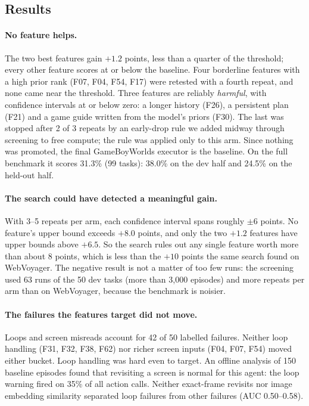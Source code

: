 \subsection{Results}

\paragraph{No feature helps.} The two best features gain $+1.2$ points, less than a quarter of the threshold; every
other feature scores at or below the baseline. Four borderline features with a high prior rank (F07, F04, F54, F17) were
retested with a fourth repeat, and none came near the threshold. Three features are
reliably \emph{harmful}, with confidence intervals at or below zero: a longer history (F26), a persistent plan (F21)
and a game guide written from the model's priors (F30). The last was stopped after 2 of 3 repeats by an early-drop
rule we added midway through screening to free compute; the rule was applied only to this arm. Since nothing was
promoted, the final GameBoyWorlds executor is the baseline. On the full benchmark it scores 31.3\% (99 tasks):
38.0\% on the dev half and 24.5\% on the held-out half.

\paragraph{The search could have detected a meaningful gain.} With 3--5 repeats per arm, each confidence interval
spans roughly $\pm 6$ points. No feature's upper bound exceeds $+8.0$ points, and only the two $+1.2$ features have
upper bounds above $+6.5$. So the search rules out any single feature worth more than about 8 points, which is less
than the $+10$ points the same search found on WebVoyager. The negative result is not a matter of too few runs: the
screening used 63 runs of the 50 dev tasks (more than 3{,}000 episodes) and more repeats per arm than on WebVoyager,
because the benchmark is noisier.

\paragraph{The failures the features target did not move.} Loops and screen misreads account for 42 of 50 labelled
failures. Neither loop handling (F31, F32, F38, F62) nor richer screen inputs (F04, F07, F54) moved either bucket.
Loop handling was hard even to target. An offline analysis of 150 baseline episodes found that revisiting a screen is
normal for this agent: the loop warning fired on 35\% of all action calls. Neither exact-frame revisits nor image
embedding similarity separated loop failures from other failures (AUC 0.50--0.58).

